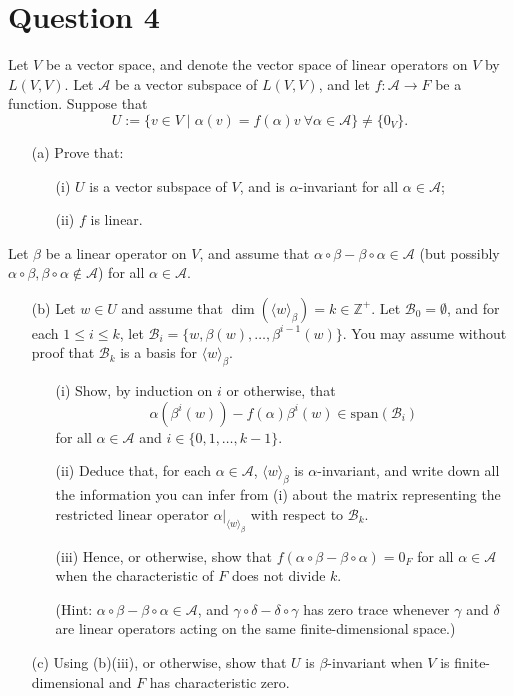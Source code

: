 \documentclass[12pt]{article}
\begin{document}
\section*{Question 4}
Let \(V\) be a vector space, and denote the vector space of linear operators on \(V\) by \(L(V, V)\). Let \(\mathcal{A}\) be a vector subspace of \(L(V, V)\), and let \(f : \mathcal{A} \to F\) be a function. Suppose that 
\[
U := \{ v \in V \mid \alpha(v) = f(\alpha)v \ \forall \alpha \in \mathcal{A} \} \neq \{ 0_V \}.
\]
\begin{enumerate}
    \item[(a)] Prove that:
    \begin{enumerate}
        \item[(i)] \(U\) is a vector subspace of \(V\), and is \(\alpha\)-invariant for all \(\alpha \in \mathcal{A}\);
        \item[(ii)] \(f\) is linear.
    \end{enumerate}
\end{enumerate}
Let \(\beta\) be a linear operator on \(V\), and assume that \(\alpha \circ \beta - \beta \circ \alpha \in \mathcal{A}\) (but possibly \(\alpha \circ \beta, \beta \circ \alpha \notin \mathcal{A}\)) for all \(\alpha \in \mathcal{A}\). 
\begin{enumerate}
    \item[(b)] Let \(w \in U\) and assume that \(\dim(\langle w \rangle_\beta) = k \in \mathbb{Z}^+\). Let \(\mathcal{B}_0 = \emptyset\), and for each \(1 \leq i \leq k\), let \(\mathcal{B}_i = \{ w, \beta(w), \ldots, \beta^{i-1}(w) \}\).
    You may assume without proof that \(\mathcal{B}_k\) is a basis for \(\langle w \rangle_\beta\).
    \begin{enumerate}
        \item[(i)] Show, by induction on \(i\) or otherwise, that 
        \[
        \alpha(\beta^i(w)) - f(\alpha) \beta^i(w) \in \text{span}(\mathcal{B}_i)
        \]
        for all \(\alpha \in \mathcal{A}\) and \(i \in \{ 0, 1, \ldots, k - 1 \}.\)

        \item[(ii)] Deduce that, for each \(\alpha \in \mathcal{A}\), \(\langle w \rangle_\beta\) is \(\alpha\)-invariant, and write down all the information you can infer from (i) about the matrix representing the restricted linear operator \(\alpha|_{\langle w \rangle_\beta}\) with respect to \(\mathcal{B}_k\).

        \item[(iii)] Hence, or otherwise, show that \(f(\alpha \circ \beta - \beta \circ \alpha) = 0_F\) for all \(\alpha \in \mathcal{A}\) when the characteristic of \(F\) does not divide \(k\). 

        (Hint: \(\alpha \circ \beta - \beta \circ \alpha \in \mathcal{A}\), and \(\gamma \circ \delta - \delta \circ \gamma\) has zero trace whenever \(\gamma\) and \(\delta\) are linear operators acting on the same finite-dimensional space.)
    \end{enumerate}

    \item[(c)] Using (b)(iii), or otherwise, show that \(U\) is \(\beta\)-invariant when \(V\) is finite-dimensional and \(F\) has characteristic zero. 
\end{enumerate}
\end{document}

